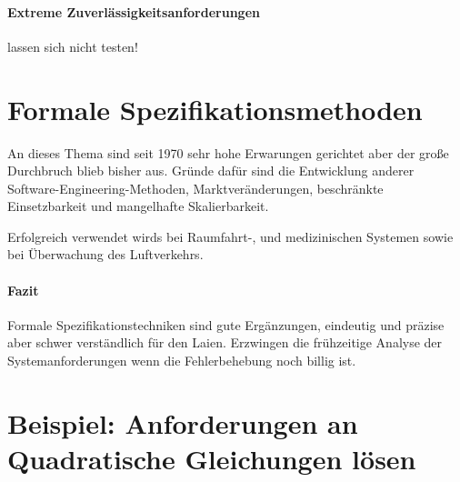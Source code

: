 
\paragraph{Extreme Zuverlässigkeitsanforderungen} lassen sich nicht testen!

\section{Formale Spezifikationsmethoden}
An dieses Thema sind seit 1970 sehr hohe Erwarungen gerichtet aber der große Durchbruch blieb bisher aus. Gründe dafür sind die Entwicklung anderer Software-Engineering-Methoden, Marktveränderungen, beschränkte Einsetzbarkeit und mangelhafte Skalierbarkeit. 

Erfolgreich verwendet wirds bei Raumfahrt-, und medizinischen Systemen sowie bei Überwachung des Luftverkehrs. 


\paragraph{Fazit}
Formale Spezifikationstechniken sind gute Ergänzungen, eindeutig und präzise aber schwer verständlich für den Laien. Erzwingen die frühzeitige Analyse der Systemanforderungen wenn die Fehlerbehebung noch billig ist.

\section{Beispiel: Anforderungen an Quadratische Gleichungen lösen}

